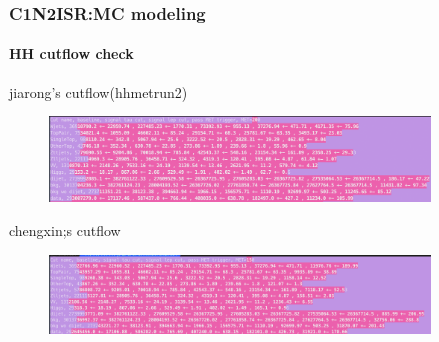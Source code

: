 \documentclass[usenames,dvipsnames]{beamer}
\begin{document}
\begin{frame}
\frametitle{C1N2ISR:MC modeling}
\framesubtitle{HH cutflow check}
jiarong's cutflow(hhmetrun2)
\begin{figure}
	\centering
	\includegraphics[width = 0.9\textwidth]{graphics/jiaronghhcutflow}
	\label{jiarong's hh cutflow}
\end{figure}
chengxin;s cutflow
\begin{figure}
	\centering
	\includegraphics[width = 0.9\textwidth]{graphics/chengxinhhcutflow}
	\label{chengxin's hh cutflow}
\end{figure}
\end{frame}
\end{document}
